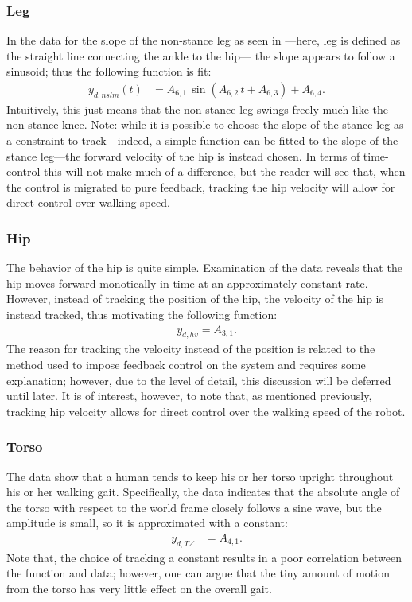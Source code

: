 \subsubsection{Leg} In the data for the slope of the non-stance leg as seen in ---here, leg is defined as the straight line connecting the ankle to the hip--- the slope appears to follow a sinusoid; thus the following function is fit:
\begin{align*}
  y_{d,nslm}(t) &= A_{6,1} \, \sin(A_{6,2} \, t + A_{6,3}) + A_{6,4}.
\end{align*}
Intuitively, this just means that the non-stance leg swings freely much like the non-stance knee. Note: while it is possible to choose the slope of the stance leg as a constraint to track---indeed, a simple function can be fitted to the slope of the stance leg---the forward velocity of the hip is instead chosen. In terms of time-control this will not make much of a difference, but the reader will see that, when the control is migrated to pure feedback, tracking the hip velocity will allow for direct control over walking speed.

\subsubsection{Hip} The behavior of the hip is quite simple. Examination of the data reveals that the hip moves forward monotically in time at an approximately constant rate. However, instead of tracking the position of the hip, the velocity of the hip is instead tracked, thus motivating the following function:
\begin{align*}
  y_{d,hv} = A_{3,1}.
\end{align*}
The reason for tracking the velocity instead of the position is related to the method used to impose feedback control on the system and requires some explanation; however, due to the level of detail, this discussion will be deferred until later. It is of interest, however, to note that, as mentioned previously, tracking hip velocity allows for direct control over the walking speed of the robot.

\subsubsection{Torso} The data show that a human tends to keep his or her torso upright throughout his or her walking gait. Specifically, the data indicates that the absolute angle of the torso with respect to the world frame closely follows a sine wave, but the amplitude is small, so it is approximated with a constant:
\begin{align*}
  y_{d,T\angle} &= A_{4,1}.
\end{align*}
Note that, the choice of tracking a constant results in a poor correlation between the function and data; however, one can argue that the tiny amount of motion from the torso has very little effect on the overall gait.

